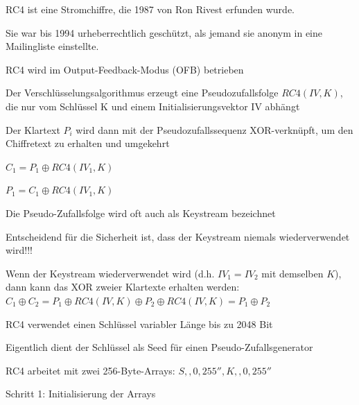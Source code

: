 \documentclass[a4paper]{article}
\begin{document}
\begin{multicols}{3}
      \begin{itemize*}
            \item RC4 ist eine Stromchiffre, die 1987 von Ron Rivest erfunden wurde.
            \item Sie war bis 1994 urheberrechtlich geschützt, als jemand sie anonym in
            eine Mailingliste einstellte.
            \item RC4 wird im Output-Feedback-Modus (OFB) betrieben
            \begin{itemize*}
                  \item Der Verschlüsselungsalgorithmus erzeugt eine Pseudozufallsfolge $RC4(IV,K)$, die nur vom Schlüssel K und einem Initialisierungsvektor IV abhängt
                  \item Der Klartext $P_i$ wird dann mit der Pseudozufallssequenz XOR-verknüpft, um den Chiffretext zu erhalten und umgekehrt
                  \begin{itemize*} \item $C_1 = P_1\oplus RC4 (IV_1,K)$ \item $P_1 = C_1\oplus RC4 (IV_1,K)$ \end{itemize*}
                  \item Die Pseudo-Zufallsfolge wird oft auch als Keystream bezeichnet
                  \item Entscheidend für die Sicherheit ist, dass der Keystream niemals wiederverwendet wird!!!
                  \begin{itemize*} \item Wenn der Keystream wiederverwendet wird (d.h. $IV_1=IV_2$ mit demselben $K$), dann kann das XOR zweier Klartexte erhalten werden: $C_1\oplus C_2= P_1\oplus RC4(IV, K)\oplus P_2\oplus RC4(IV,K) = P_1\oplus P_2$ \end{itemize*}
            \end{itemize*}
            \item RC4 verwendet einen Schlüssel variabler Länge bis zu 2048 Bit
            \begin{itemize*}
                  \item Eigentlich dient der Schlüssel als Seed für einen Pseudo-Zufallsgenerator
            \end{itemize*}
            \item RC4 arbeitet mit zwei 256-Byte-Arrays: $S,,0,255'', K,,0,255''$
            \begin{itemize*}
                  \item Schritt 1: Initialisierung der Arrays

\end{itemize*}
\end{itemize*}
\end{multicols}
\end{document}

